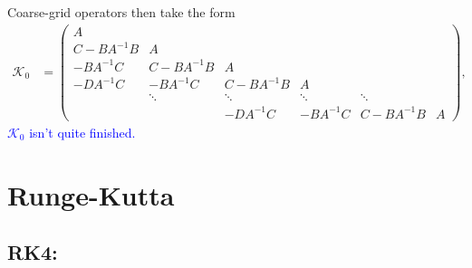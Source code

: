 \documentclass[a4paper,12pt]{article}
\newcommand{\tcb}{\textcolor{blue}}
\begin{document}
Coarse-grid operators then take the form
%
\begin{align*}
\mathcal{K}_0 & =
\begin{pmatrix}
	A \\
	C - BA^{-1}B& A \\ 
	-BA^{-1}C & C- BA^{-1}B & A \\
	- DA^{-1}C & - BA^{-1}C & C - BA^{-1}B & A \\
	& \ddots & \ddots & \ddots & \ddots \\
	& & - DA^{-1}C & -BA^{-1}C & C - BA^{-1}B & A
\end{pmatrix},
\end{align*}
%
\tcb{$\mathcal{K}_0$ isn't quite finished.}





\newpage
\section{Runge-Kutta}\label{sec:RK}

\subsection{RK4:} 
\end{document}
